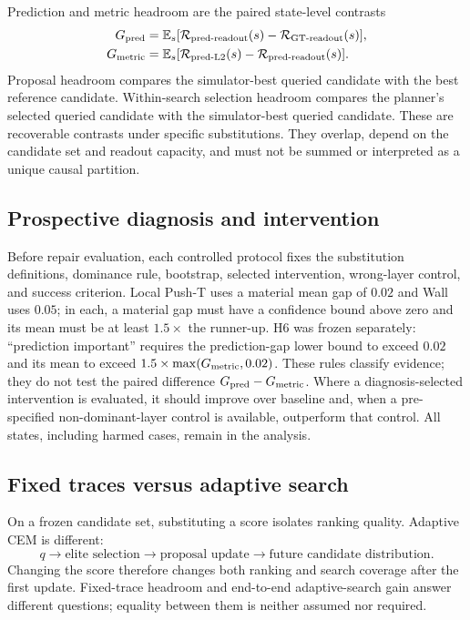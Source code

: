Prediction and metric headroom are the paired state-level contrasts
\begin{align}
G_{\mathrm{pred}} &= \mathbb{E}_s[\mathcal{R}_{\text{pred-readout}}(s)-\mathcal{R}_{\text{GT-readout}}(s)],\\
G_{\mathrm{metric}} &= \mathbb{E}_s[\mathcal{R}_{\text{pred-L2}}(s)-\mathcal{R}_{\text{pred-readout}}(s)].
\end{align}
Proposal headroom compares the simulator-best queried candidate with the best reference candidate. Within-search selection headroom compares the planner's selected queried candidate with the simulator-best queried candidate. These are recoverable contrasts under specific substitutions. They overlap, depend on the candidate set and readout capacity, and must not be summed or interpreted as a unique causal partition.

\subsection{Prospective diagnosis and intervention}

Before repair evaluation, each controlled protocol fixes the substitution definitions, dominance rule, bootstrap, selected intervention, wrong-layer control, and success criterion. Local Push-T uses a material mean gap of $0.02$ and Wall uses $0.05$; in each, a material gap must have a confidence bound above zero and its mean must be at least $1.5\times$ the runner-up. H6 was frozen separately: ``prediction important'' requires the prediction-gap lower bound to exceed $0.02$ and its mean to exceed $1.5\times\max(G_{\mathrm{metric}},0.02)$. These rules classify evidence; they do not test the paired difference $G_{\mathrm{pred}}-G_{\mathrm{metric}}$. Where a diagnosis-selected intervention is evaluated, it should improve over baseline and, when a pre-specified non-dominant-layer control is available, outperform that control. All states, including harmed cases, remain in the analysis.

\subsection{Fixed traces versus adaptive search}
\label{sec:adaptive}

On a frozen candidate set, substituting a score isolates ranking quality. Adaptive CEM is different:
\[
q \longrightarrow \text{elite selection} \longrightarrow \text{proposal update}
\longrightarrow \text{future candidate distribution}.
\]
Changing the score therefore changes both ranking and search coverage after the first update. Fixed-trace headroom and end-to-end adaptive-search gain answer different questions; equality between them is neither assumed nor required.
